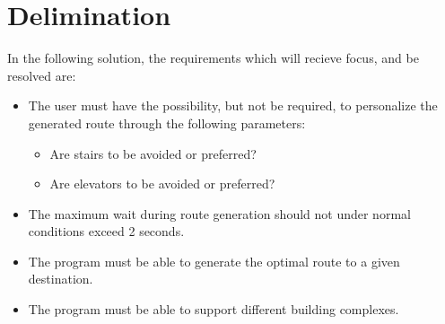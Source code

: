 
\section{Delimination}

In the following solution, the requirements which will recieve focus, and be resolved are:

\begin{itemize}
  \item The user must have the possibility, but not be required, to personalize the generated route through the following parameters:
      \begin{itemize}
        \item Are stairs to be avoided or preferred?
        \item Are elevators to be avoided or preferred?
      \end{itemize}
  \item The maximum wait during route generation should not under normal conditions exceed 2 seconds.

  \item The program must be able to generate the optimal route to a given destination.

  \item The program must be able to support different building complexes.

\end{itemize}


